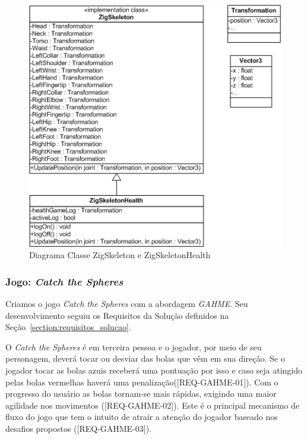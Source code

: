 \begin{figure}[!htbp]
 \centering
 \includegraphics[scale=0.8]{./img/diagclasszigfu.png}
 \caption{Diagrama Classe ZigSkeleton e ZigSkeletonHealth}
 \label{fig:diagramaclassezigfu}
\end{figure}
%

\subsubsection{Jogo: \textit{Catch the Spheres}}\label{jogo_catch}
Criamos o jogo \textit{Catch the Spheres} com a abordagem \textit{GAHME}. Seu desenvolvimento seguiu os Requisitos da Solução definidos na Seção~\ref{section:requisitos_solucao}.  

O \textit{Catch the Spheres} é em terceira pessoa e o jogador, por meio de seu personagem, deverá tocar ou desviar das bolas que vêm em sua direção. Se o jogador tocar as bolas azuis receberá uma pontuação por isso e caso seja atingido pelas bolas vermelhas  haverá uma penalização([REQ-GAHME-01]). Com o progresso do usuário as bolas tornam-se mais rápidas, exigindo uma maior agilidade nos movimentos ([REQ-GAHME-02]). Este é o principal mecanismo de fluxo do jogo que tem o intuito de atrair a atenção do jogador baseado nos desafios propostos ([REQ-GAHME-03]). 

